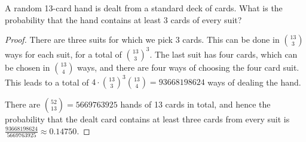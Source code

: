 \begin{exercise}{33}
    A random 13-card hand is dealt from a standard deck of cards. What is the probability
that the hand contains at least 3 cards of every suit?
\end{exercise}
 
\begin{proof}
    There are three suits for which we pick 3 cards. This can be done in $13 \choose 3$ ways for each suit, for a total of ${13 \choose 3}^3$. The last suit has four cards, which can be chosen in $13 \choose 4$ ways, and there are four ways of choosing the four card suit. This leads to a total of $4 \cdot {13 \choose 3}^3{13 \choose 4}= 93668198624$ ways of dealing the hand.

    There are ${52\choose 13} = 5669763925$ hands of 13 cards in total, and hence the probability that the dealt card contains at least three cards from every suit is $\frac{93668198624}{5669763925} \approx 0.14750$.
\end{proof}

